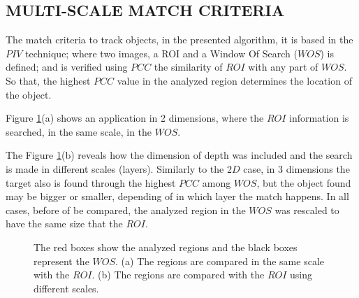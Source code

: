 
\subsection{MULTI-SCALE MATCH CRITERIA}
The match criteria to track objects, in the presented algorithm, 
it is based in the $PIV$ technique; 
where two images, a ROI and a Window Of Search ($WOS$) is defined; and is 
verified using $PCC$ the similarity of $ROI$ with any part of $WOS$. 
So that, the highest $PCC$ value in the analyzed region 
determines the location of the object.

Figure \ref{fig:multires}(a) shows an application in 2 dimensions, where
the $ROI$ information is searched, in the same scale,  in the $WOS$.

The Figure \ref{fig:multires}(b) reveals how the dimension of depth was included and
the search is made in different scales (layers). Similarly to the $2D$ case, 
in 3 dimensions the target 
also is found through the highest $PCC$ among $WOS$, but the object found may be 
bigger or smaller, depending of in which layer the match happens. 
In all cases, before of be compared, the analyzed region in the $WOS$ was 
rescaled to have the same size that the $ROI$.

\begin{figure}[H]
\centering
  \caption{The red boxes show the analyzed regions and the black boxes represent the $WOS$. 
  (a) The regions are compared in the same scale with the $ROI$. 
  (b) The regions are compared with the $ROI$  using different scales.}
  \label{fig:multires}
\end{figure}




